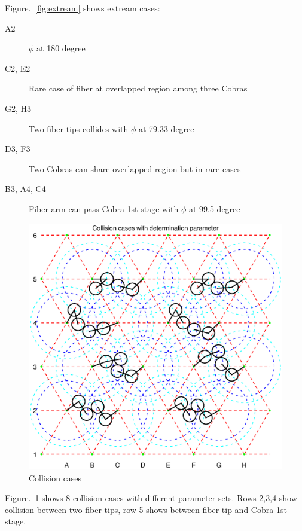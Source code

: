 \documentclass[a4paper,notitlepage]{article}
\begin{document}
Figure.~\ref{fig:extream} shows extream cases:
\begin{description}
  \item[A2] $\phi$ at 180 degree
  \item[C2, E2] Rare case of fiber at overlapped region among three Cobras
  \item[G2, H3] Two fiber tips collides with $\phi$ at 79.33 degree
  \item[D3, F3] Two Cobras can share overlapped region but in rare cases
  \item[B3, A4, C4] Fiber arm can pass Cobra 1st stage with $\phi$ at 99.5 degree
\end{description}

\begin{figure}[htb]
  \begin{center}
    \includegraphics{cases.eps}
  \end{center}
  \caption{Collision cases}
  \label{fig:cases}
\end{figure}

Figure.~\ref{fig:cases} shows 8 collision cases with different parameter sets. 
Rows 2,3,4 show collision between two fiber tips, row 5 shows between fiber tip 
and Cobra 1st stage. 
\end{document}
